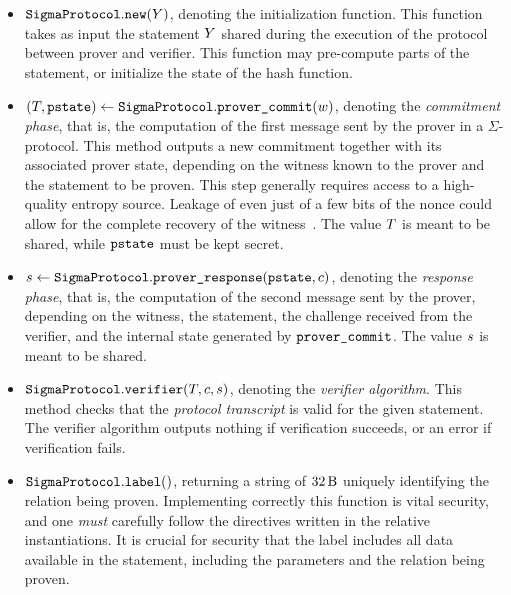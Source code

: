 \documentclass[11pt]{article}
\begin{document}
      \begin{itemize}
        \item $\texttt{SigmaProtocol}.\texttt{new}(Y)$,
        denoting the initialization function. This function takes as input the statement $Y$ shared during the execution of the protocol between prover and verifier.
        This function may pre-compute parts of the statement, or initialize the state of the hash function.
        \item
          $(T, \texttt{pstate})\gets \texttt{SigmaProtocol}.\texttt{prover\_commit}(w)$,
          denoting the \emph{commitment phase}, that is, the computation of the first message sent by the prover in a $\Sigma$-protocol. This method outputs a new commitment together with its associated prover state, depending on the witness known to the prover and the statement to be proven.
          This step generally requires access to a high-quality entropy source.
          Leakage of even just of a few bits of the nonce could allow for the complete recovery of the witness~\cite{lattice-attack,bleichenbacher,CCS:ANTTY20}.
					The value $T$ is meant to be shared, while $\texttt{pstate}$ must be kept secret.
        \item
          $s \gets \texttt{SigmaProtocol}.\texttt{prover\_response}(\texttt{pstate}, c)$,
          denoting the \emph{response phase}, that is, the computation of the second message sent by the prover, depending on the witness, the statement, the challenge received from the verifier, and the internal state generated by $\texttt{prover\_commit}$.
          The value $s$ is meant to be shared.
        \item $\texttt{SigmaProtocol}.\texttt{verifier}(T, c, s)$,
          denoting the \emph{verifier algorithm}. This method checks that
          the \emph{protocol transcript} is valid for the given statement.
          The verifier algorithm outputs nothing if verification succeeds,
          or an error if verification fails.
          \item $\texttt{SigmaProtocol}.\texttt{label}()$,
          returning a string of $\seedlen$ uniquely identifying the relation being proven.
          Implementing correctly this function is vital security, and one \emph{must} carefully follow the directives written in the relative instantiations. It is crucial for security that the label includes all data available in the statement, including the parameters and the relation being proven.


\end{itemize}
\end{document}
